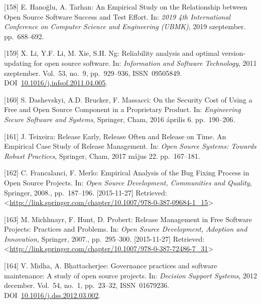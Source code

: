 \documentclass[12pt,magyar,a4paper,oneside]{scrreprt}
\newenvironment{cslreferences}%
  {}%
  {\par}
\begin{document}
\begin{cslreferences}
\leavevmode\hypertarget{ref-hanoglu_empirical_2019}{}%
{[}158{]} E. Hanoğlu, A. Tarhan: An Empirical Study on the Relationship
between Open Source Software Success and Test Effort. In: \emph{2019 4th
International Conference on Computer Science and Engineering (UBMK)},
2019 szeptember. pp.~688--692.

\leavevmode\hypertarget{ref-li_reliability_2011}{}%
{[}159{]} X. Li, Y.F. Li, M. Xie, S.H. Ng: Reliability analysis and
optimal version-updating for open source software. In: \emph{Information
and Software Technology}, 2011 szeptember. Vol.~53, no.~9, pp.~929--936,
ISSN~09505849.
DOI~\href{https://doi.org/10.1016/j.infsof.2011.04.005}{10.1016/j.infsof.2011.04.005}.

\leavevmode\hypertarget{ref-dashevskyi_security_2016}{}%
{[}160{]} S. Dashevskyi, A.D. Brucker, F. Massacci: On the Security Cost
of Using a Free and Open Source Component in a Proprietary Product. In:
\emph{Engineering Secure Software and Systems}, Springer, Cham, 2016
április 6. pp.~190--206.

\leavevmode\hypertarget{ref-teixeira_release_2017}{}%
{[}161{]} J. Teixeira: Release Early, Release Often and Release on Time.
An Empirical Case Study of Release Management. In: \emph{Open Source
Systems: Towards Robust Practices}, Springer, Cham, 2017 május 22.
pp.~167--181.

\leavevmode\hypertarget{ref-francalanci_empirical_2008}{}%
{[}162{]} C. Francalanci, F. Merlo: Empirical Analysis of the Bug Fixing
Process in Open Source Projects. In: \emph{Open Source Development,
Communities and Quality}, Springer, 2008., pp.~187--196.
{[}2015-11-27{]} Retrieved:
\textless{}\url{http://link.springer.com/chapter/10.1007/978-0-387-09684-1_15}\textgreater{}

\leavevmode\hypertarget{ref-michlmayr_release_2007}{}%
{[}163{]} M. Michlmayr, F. Hunt, D. Probert: Release Management in Free
Software Projects: Practices and Problems. In: \emph{Open Source
Development, Adoption and Innovation}, Springer, 2007., pp.~295--300.
{[}2015-11-27{]} Retrieved:
\textless{}\url{http://link.springer.com/chapter/10.1007/978-0-387-72486-7_31}\textgreater{}

\leavevmode\hypertarget{ref-midha_governance_2012}{}%
{[}164{]} V. Midha, A. Bhattacherjee: Governance practices and software
maintenance: A study of open source projects. In: \emph{Decision Support
Systems}, 2012 december. Vol.~54, no.~1, pp.~23--32, ISSN~01679236.
DOI~\href{https://doi.org/10.1016/j.dss.2012.03.002}{10.1016/j.dss.2012.03.002}.


\end{cslreferences}
\end{document}
